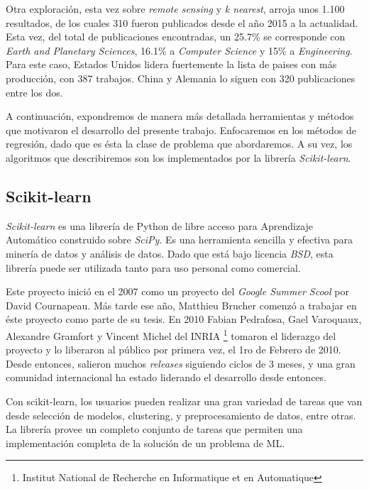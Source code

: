     \par Otra exploración, esta vez sobre \textit{remote sensing} y \textit{k nearest},
      arroja unos 1.100 resultados, de los cuales 310 fueron publicados desde
      el año 2015 a la actualidad. Esta vez, del total de publicaciones encontradas,
      un 25.7\% se corresponde con \textit{Earth and Planetary Sciences}, 16.1\%
      a \textit{Computer Science} y 15\% a \textit{Engineering}. Para este caso,
      Estados Unidos lidera fuertemente la lista de paises con más producción,
      con 387 trabajos. China y Alemania lo siguen con 320 publicaciones entre
      los dos.


    \par A continuación, expondremos de manera más detallada
      herramientas y métodos que motivaron el desarrollo del presente
      trabajo. Enfocaremos en los métodos de regresión, dado que es ésta la clase
      de problema que abordaremos. A su vez, los algoritmos que describiremos son
      los implementados por la librería \textit{Scikit-learn}.

  \subsection{Scikit-learn}

    \par \textit{Scikit-learn}\cite{scikit-learn, sklearn_review} es una librería
      de Python de libre acceso para Aprendizaje Automático
      construido sobre \textit{SciPy}\cite{scipy}. Es una herramienta
      sencilla y efectiva para minería de datos y análisis de datos. Dado que está bajo
      licencia \textit{BSD}, esta librería puede ser utilizada tanto
      para uso personal como comercial.

    \par Este proyecto inició en el 2007 como un proyecto del \textit{Google Summer Scool} por David
      Cournapeau. Más tarde ese año, Matthieu Brucher comenzó a trabajar en éste proyecto
      como parte de su tesis. En 2010 Fabian Pedrafosa, Gael Varoquaux, Alexandre
      Gramfort y Vincent Michel del INRIA \footnote{Institut National de Recherche
      en Informatique et en Automatique} tomaron el liderazgo del proyecto y lo liberaron
      al público por primera vez, el 1ro de Febrero de 2010. Desde entonces, salieron muchos
      \textit{releases} siguiendo ciclos de 3 meses, y una gran comunidad internacional
      ha estado liderando el desarrollo desde entonces.

    \par Con scikit-learn, los usuarios pueden realizar una gran variedad de tareas
      que van desde selección de modelos, clustering, y preprocesamiento de datos, entre otras.
      La librería provee un completo conjunto de tareas que permiten una
      implementación completa de la solución de un problema de ML.

